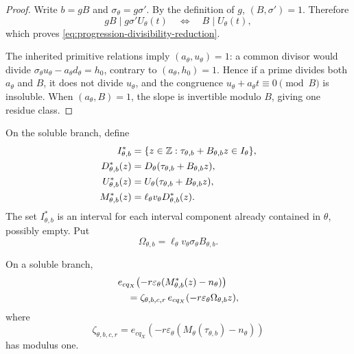 \begin{proof}
Write \(b=gB\) and \(\sigma_\theta=g\sigma'\).  By the definition of
\(g\), \((B,\sigma')=1\).  Therefore
\[
 gB\mid g\sigma' U_\theta(t)
 \quad\Longleftrightarrow\quad B\mid U_\theta(t),
\]
which proves \eqref{eq:progression-divisibility-reduction}.

The inherited primitive relations imply
\((a_\theta,u_\theta)=1\): a common divisor would divide
\(\sigma_\theta u_\theta-a_\theta d_\theta=h_0\), contrary to
\((a_\theta,h_0)=1\).  Hence if a prime divides both
\(a_\theta\) and \(B\), it does not divide \(u_\theta\), and the
congruence \(u_\theta+a_\theta t\equiv0\pmod B\) is insoluble.
When \((a_\theta,B)=1\), the slope is invertible modulo \(B\), giving
one residue class.
\end{proof}

On the soluble branch, define
\begin{align}
 I_{\theta,b}^\ast
 &=
 \{z\in\mathbb Z:
 \tau_{\theta,b}+B_{\theta,b}z\in I_\theta\},
\label{eq:progression-resolved-interval}\\
 D_{\theta,b}^\ast(z)
 &=
 D_\theta(\tau_{\theta,b}+B_{\theta,b}z),
\label{eq:progression-D}\\
 U_{\theta,b}^\ast(z)
 &=
 U_\theta(\tau_{\theta,b}+B_{\theta,b}z),
\label{eq:progression-U}\\
 M_{\theta,b}^\ast(z)
 &=
 \ell_\theta v_\theta D_{\theta,b}^\ast(z).
\label{eq:progression-M}
\end{align}
The set \(I_{\theta,b}^\ast\) is an interval for each interval
component already contained in \(\theta\), possibly empty.  Put
\begin{equation}
 \Omega_{\theta,b}
 =
 \ell_\theta v_\theta\sigma_\theta B_{\theta,b}.
\label{eq:progression-phase-slope}
\end{equation}

\begin{proposition}
\label{prop:resolved-phase}
On a soluble branch,
\begin{align}
 &e_{cq_X}\!\left(
 -r\varepsilon_\theta
 (M_{\theta,b}^\ast(z)-n_\theta)\right)
\notag\\
 &\quad=
 \zeta_{\theta,b,c,r}\,
 e_{cq_X}(-r\varepsilon_\theta\Omega_{\theta,b}z),
\label{eq:progression-resolved-phase}
\end{align}
where
\[
 \zeta_{\theta,b,c,r}
 =
 e_{cq_X}\!\left(
 -r\varepsilon_\theta
 (M_\theta(\tau_{\theta,b})-n_\theta)\right)
\]
has modulus one.
\end{proposition}

